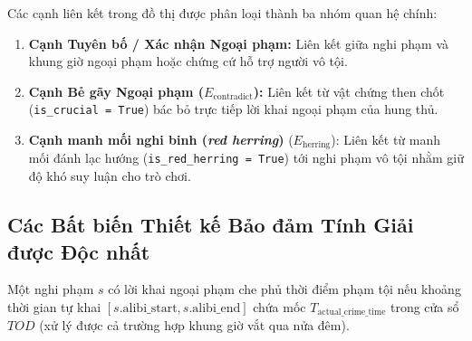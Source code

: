 Các cạnh liên kết trong đồ thị được phân loại thành ba nhóm quan hệ chính:
\begin{enumerate}[leftmargin=1.5cm]
    \item \textbf{Cạnh Tuyên bố / Xác nhận Ngoại phạm:} Liên kết giữa nghi phạm và khung giờ ngoại phạm hoặc chứng cứ hỗ trợ người vô tội.
    \item \textbf{Cạnh Bẻ gãy Ngoại phạm ($E_{\text{contradict}}$):} Liên kết từ vật chứng then chốt (\texttt{is\_crucial = True}) bác bỏ trực tiếp lời khai ngoại phạm của hung thủ.
    \item \textbf{Cạnh manh mối nghi binh (\textit{red herring})} ($E_{\text{herring}}$): Liên kết từ manh mối đánh lạc hướng (\texttt{is\_red\_herring = True}) tới nghi phạm vô tội nhằm giữ độ khó suy luận cho trò chơi.
\end{enumerate}

\subsection{Các Bất biến Thiết kế Bảo đảm Tính Giải được Độc nhất}

\begin{definition}
Một nghi phạm $s$ có lời khai ngoại phạm che phủ thời điểm phạm tội nếu khoảng thời gian tự khai $[s.\text{alibi\_start}, s.\text{alibi\_end}]$ chứa mốc $T_{\text{actual\_crime\_time}}$ trong cửa sổ $TOD$ (xử lý được cả trường hợp khung giờ vắt qua nửa đêm).
\end{definition}

